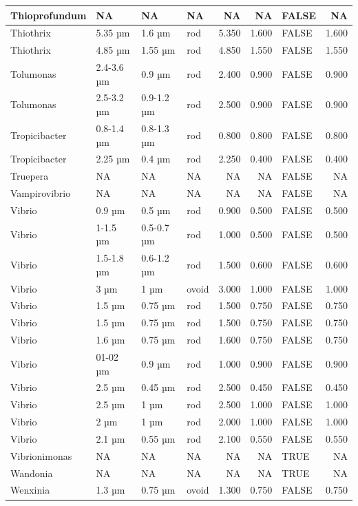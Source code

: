 \documentclass[
]{article}
\begin{document}
\begin{table}
\begin{tabular}{l|l|l|l|r|r|l|r}
\hline
Thioprofundum & NA & NA & NA & NA & NA & FALSE & NA\\
\hline
Thiothrix & 5.35 µm & 1.6 µm & rod & 5.350 & 1.600 & FALSE & 1.600\\
\hline
Thiothrix & 4.85 µm & 1.55 µm & rod & 4.850 & 1.550 & FALSE & 1.550\\
\hline
Tolumonas & 2.4-3.6 µm & 0.9 µm & rod & 2.400 & 0.900 & FALSE & 0.900\\
\hline
Tolumonas & 2.5-3.2 µm & 0.9-1.2 µm & rod & 2.500 & 0.900 & FALSE & 0.900\\
\hline
Tropicibacter & 0.8-1.4 µm & 0.8-1.3 µm & rod & 0.800 & 0.800 & FALSE & 0.800\\
\hline
Tropicibacter & 2.25 µm & 0.4 µm & rod & 2.250 & 0.400 & FALSE & 0.400\\
\hline
Truepera & NA & NA & NA & NA & NA & FALSE & NA\\
\hline
Vampirovibrio & NA & NA & NA & NA & NA & FALSE & NA\\
\hline
Vibrio & 0.9 µm & 0.5 µm & rod & 0.900 & 0.500 & FALSE & 0.500\\
\hline
Vibrio & 1-1.5 µm & 0.5-0.7 µm & rod & 1.000 & 0.500 & FALSE & 0.500\\
\hline
Vibrio & 1.5-1.8 µm & 0.6-1.2 µm & rod & 1.500 & 0.600 & FALSE & 0.600\\
\hline
Vibrio & 3 µm & 1 µm & ovoid & 3.000 & 1.000 & FALSE & 1.000\\
\hline
Vibrio & 1.5 µm & 0.75 µm & rod & 1.500 & 0.750 & FALSE & 0.750\\
\hline
Vibrio & 1.5 µm & 0.75 µm & rod & 1.500 & 0.750 & FALSE & 0.750\\
\hline
Vibrio & 1.6 µm & 0.75 µm & rod & 1.600 & 0.750 & FALSE & 0.750\\
\hline
Vibrio & 01-02 µm & 0.9 µm & rod & 1.000 & 0.900 & FALSE & 0.900\\
\hline
Vibrio & 2.5 µm & 0.45 µm & rod & 2.500 & 0.450 & FALSE & 0.450\\
\hline
Vibrio & 2.5 µm & 1 µm & rod & 2.500 & 1.000 & FALSE & 1.000\\
\hline
Vibrio & 2 µm & 1 µm & rod & 2.000 & 1.000 & FALSE & 1.000\\
\hline
Vibrio & 2.1 µm & 0.55 µm & rod & 2.100 & 0.550 & FALSE & 0.550\\
\hline
Vibrionimonas & NA & NA & NA & NA & NA & TRUE & NA\\
\hline
Wandonia & NA & NA & NA & NA & NA & TRUE & NA\\
\hline
Wenxinia & 1.3 µm & 0.75 µm & ovoid & 1.300 & 0.750 & FALSE & 0.750\\

\end{tabular}
\end{table}
\end{document}

